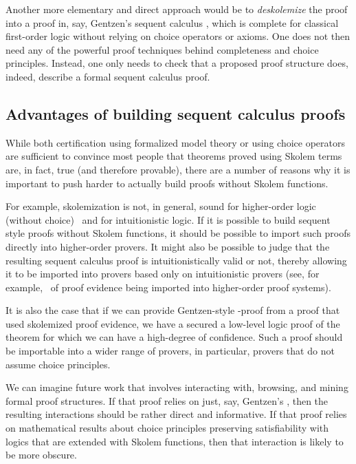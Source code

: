 \documentclass[a4paper,USenglish]{lipics-v2018}
\begin{document}

Another more elementary and direct approach would be to
\emph{deskolemize} the proof into a proof in, say, Gentzen's sequent
calculus \LK, which is complete for classical first-order logic
without relying on choice operators or axioms.
%
One does not then need any of the powerful proof techniques behind
completeness and choice principles.
%
Instead, one only needs to check that a proposed proof structure does,
indeed, describe a formal sequent calculus proof.

\subsection{Advantages of building sequent calculus proofs}
\label{ssec:advantages}

While both certification using formalized model theory or using choice
operators are sufficient to convince most people that theorems proved
using Skolem terms are, in fact, true (and therefore provable), there
are a number of reasons why it is important to push harder to actually
build proofs without Skolem functions.

For example, skolemization is not, in general, sound for higher-order
logic (without choice)~\cite{miller87sl} and for intuitionistic logic.
%
If it is possible to build sequent style proofs without Skolem
functions, it should be possible to import such proofs directly into
higher-order provers.
%
It might also be possible to judge that the resulting sequent calculus
proof is intuitionistically valid or not, thereby allowing it to be
imported into provers based only on intuitionistic provers (see, for
example,~\cite{fontaine06tacas,stump13fmsd} of proof evidence being
imported into higher-order proof systems).

It is also the case that if we can provide Gentzen-style \LK-proof from
a proof that used skolemized proof evidence, we have a secured a
low-level logic proof of the theorem for which we can have a
high-degree of confidence.
%
Such a proof should be importable into a wider range of provers, in
particular, provers that do not assume choice principles.

We can imagine future work that involves interacting with, browsing,
and mining \cite{kohlenbach03apal} formal proof structures.  If that
proof relies on just, say, Gentzen's \LK, then the resulting
interactions should be rather direct and informative.  If that proof
relies on mathematical results about choice principles preserving
satisfiability with logics that are extended with Skolem functions,
then that interaction is likely to be more obscure.
\end{document}
